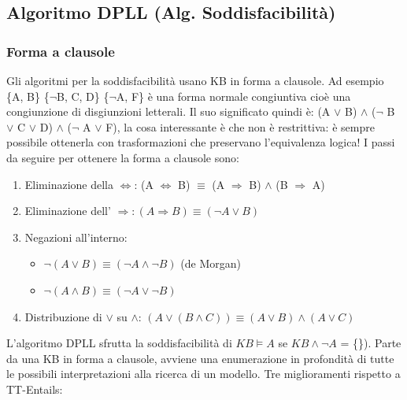\documentclass{article}
\begin{document}
\subsection{Algoritmo DPLL (Alg. Soddisfacibilità)}
\subsubsection{Forma a clausole}
Gli algoritmi per la soddisfacibilità usano KB in forma a clausole. \newline 
Ad esempio \{A, B\} \{$\neg$B, C, D\} \{$\neg$A, F\} è una forma normale congiuntiva cioè una congiunzione di disgiunzioni letterali. Il suo significato quindi è: \newline 
(A $\lor$ B) $\land$ ($\neg$ B $\lor$ C $\lor$ D) $\land$ ($\neg$ A $\lor$ F), la cosa interessante è che non è restrittiva: è sempre possibile ottenerla con trasformazioni che preservano l’equivalenza logica! \newline 
I passi da seguire per ottenere la forma a clausole sono: 
\begin{enumerate}
    \item Eliminazione della $\Leftrightarrow$: (A $\Leftrightarrow$ B) $\equiv$ (A $\Rightarrow$ B) $\land$ (B $\Rightarrow$ A)
    \item Eliminazione dell’ $\Rightarrow: (A \Rightarrow B) \equiv (\neg A \lor B)$
    \item Negazioni all’interno: \begin{itemize}
        \item $\neg (A \lor B) \equiv (\neg A \land \neg B)$	(de Morgan)	
        \item $\neg (A \land B) \equiv (\neg A \lor \neg B)$
    \end{itemize}   
    \item Distribuzione di $\lor$ su $\land$: $(A \lor (B \land C)) \equiv (A \lor B) \land (A \lor C)$
\end{enumerate}
L'algoritmo DPLL sfrutta la soddisfacibilità di $KB \models A$ se $KB \land \neg A$ = \{\}). Parte da una KB in forma a clausole, avviene una enumerazione in profondità di tutte le possibili interpretazioni alla ricerca di un modello. Tre miglioramenti rispetto a TT-Entails: 
\end{document}
